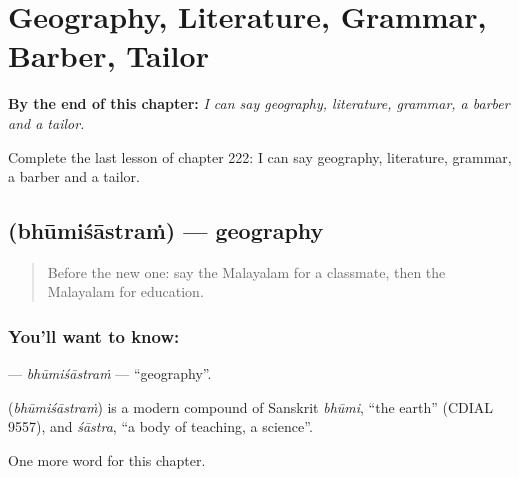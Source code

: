 
\chapter{Geography, Literature, Grammar, Barber, Tailor}
\label{ch:ml-geography-literature-grammar-barber-tailor}

\begin{chapteropening}
\textbf{By the end of this chapter:} \emph{I can say geography, literature, grammar, a barber and a tailor.}

Complete the last lesson of chapter 222: I can say geography, literature, grammar, a barber and a tailor.
\end{chapteropening}

\section[\texorpdfstring{\ml{ഭൂമിശാസ്ത്രം} (bhūmiśāstraṁ)}{ഭൂമിശാസ്ത്രം (bhūmiśāstraṁ)}]{ (bhūmiśāstraṁ) — geography}

\label{lesson:ML-C222-bhumisastram}



\begin{quote}
Before the new one: say the Malayalam for a classmate, then the Malayalam for education.
\end{quote}

\subsection*{You'll want to know: }
\textbf{} — \emph{bhūmiśāstraṁ} — \textquotedblleft{}geography\textquotedblright{}.

\begin{cousinweb}
\textbf{} (\emph{bhūmiśāstraṁ}) is a modern compound of Sanskrit \emph{bhūmi}, \textquotedblleft{}the earth\textquotedblright{} (CDIAL 9557), and \emph{śāstra}, \textquotedblleft{}a body of teaching, a science\textquotedblright{}.
\end{cousinweb}

\begin{grammarlens}[title={What you've built}]
One more word for this chapter.
\end{grammarlens}

